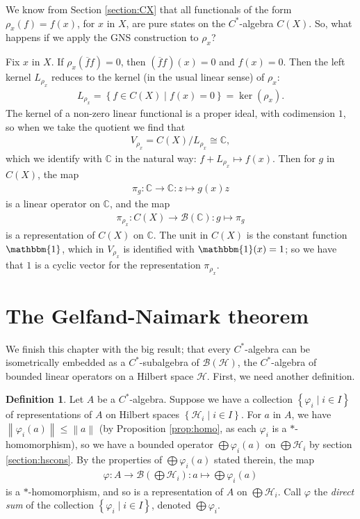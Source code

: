 \documentclass[11pt,a4paper]{report}
\theoremstyle{plain}
\theoremstyle{definition}
\newtheorem{defn}{Definition}
\newcommand{\1}{\mathbbm{1}}
\newcommand{\C}{\mathbb{C}}
\renewcommand{\H}{\mathcal{H}}
\newcommand{\B}{\mathcal{B}}
\newcommand{\BH}{\mathcal{\B(\H)}}
\renewcommand{\phi}{\varphi}
\newcommand{\CX}{C(X)}
\renewcommand{\bar}{\overline}
\renewcommand{\oplus}{\textstyle\bigoplus}
\begin{document}
We know from Section \ref{section:CX} that all functionals of the form $\rho_x(f) = f(x)$, for $x$ in 
$X$, are pure states on the $C^\ast$-algebra $\CX$. So, what happens if we apply the GNS construction to 
$\rho_x$?

Fix $x$ in $X$. If $\rho_x(\bar f f)=0$, then $(\bar f f)(x)=0$ and $f(x)=0$. Then the left kernel
$L_{\rho_x}$ reduces to the kernel (in the usual linear sense) of $\rho_x$:
\begin{align*}
	L_{\rho_x} = \left\{f\in\CX \mid f(x) = 0\right\} = \ker(\rho_x).
\end{align*}
The kernel of a non-zero linear functional is a proper ideal, with codimension $1$, so when we take the 
quotient we find that 
\begin{align*}
	V_{\rho_x} = \CX/L_{\rho_x} \cong \C,
\end{align*}
which we identify with $\C$ in the natural way: $f+L_{\rho_x} \mapsto f(x)$.
Then for $g$ in $\CX$, the map 
\begin{align*}
	\pi_g:\C\to\C:z\mapsto g(x)z
\end{align*} 
is a linear operator on $\C$, and the map 
\begin{align*}
	\pi_{\rho_x}:\CX\to\B(\C):g\mapsto\pi_g
\end{align*} 
is a representation of $\CX$ on $\C$.
The unit in $\CX$ is the constant function $\1$, which in $V_{\rho_x}$ is identified with $\1(x)=1$; so 
we have that $1$ is a cyclic vector for the representation $\pi_{\rho_x}$.

\section{The Gelfand-Naimark theorem}\label{section:gn}
We finish this chapter with the big result; that every $C^\ast$-algebra can be isometrically embedded 
as a $C^\ast$-subalgebra of $\BH$, the $C^\ast$-algebra of bounded linear operators on a Hilbert space 
$\H$. First, we need another definition.
\begin{defn}
	Let $A$ be a $C^\ast$-algebra. Suppose we have a collection $\left\{\phi_i \mid i\in I\right\}$ of 
	representations of $A$ on Hilbert spaces $\left\{\H_i \mid i\in I\right\}$.
	For $a$ in $A$, we have $\left\|\phi_i(a)\right\| \leq \left\|a\right\|$ (by Proposition \ref{prop:homo}, as each $\phi_i$ 
	is a $\ast$-homomorphism), so we have a bounded operator $\oplus\phi_i(a)$ on $\oplus \H_i$ by 
	section \ref{section:hscons}. By the properties of $\oplus\phi_i(a)$ stated therein, the map 
	\begin{align*}
		\phi:A\to \B(\oplus\H_i):a\mapsto\oplus\phi_i(a)
	\end{align*}
	is a $\ast$-homomorphism, and so is a representation of $A$ on $\oplus\H_i$. Call $\phi$ the 
	\emph{direct sum} of the collection $\left\{\phi_i \mid i\in I\right\}$, denoted $\oplus\phi_i$.
\end{defn}
\end{document}

